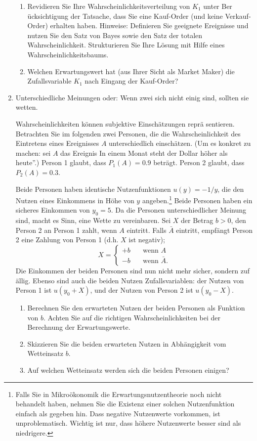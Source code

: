 \begin{enumerate}
\begin{enumerate}
\item Revidieren Sie Ihre Wahrscheinlichkeitsverteilung von $K_{1}$ unter Ber%
\"{u}cksichtigung der Tatsache, dass Sie eine Kauf-Order (und keine
Verkauf-Order) erhalten haben. Hinweise: Definieren Sie geeignete Ereignisse
und nutzen Sie den Satz von Bayes sowie den Satz der totalen
Wahrscheinlichkeit. Strukturieren Sie Ihre L\"{o}sung mit Hilfe eines
Wahrscheinlichkeitsbaums.
\item Welchen Erwartungswert hat (aus Ihrer Sicht als Market Maker) die
Zufallsvariable $K_{1}$ nach Eingang der Kauf-Order?
\end{enumerate}

\item Unterschiedliche Meinungen oder: Wenn zwei sich nicht einig sind,
sollten sie wetten.

Wahrscheinlichkeiten k\"{o}nnen subjektive Einsch\"{a}tzungen repr\"{a}%
sentieren. Betrachten Sie im folgenden zwei Personen, die die
Wahrscheinlichkeit des Eintretens eines Ereignisses $A$ unterschiedlich
einsch\"{a}tzen. (Um es konkret zu machen: sei $A$ das Ereignis
\quotedblbase In einem Monat steht der Dollar h\"{o}her als
heute\textquotedblright .) Person 1 glaubt, dass $P_{1}(A)=0.9$ betr\"{a}gt.
Person 2 glaubt, dass $P_{2}(A)=0.3$.

Beide Personen haben identische Nutzenfunktionen $u(y)=-1/y$, die den Nutzen
eines Einkommens in H\"{o}he von $y$ angeben.\footnote{%
Falls Sie in Mikro\"{o}konomik die Erwartungsnutzentheorie noch nicht
behandelt haben, nehmen Sie die Existenz einer solchen Nutzenfunktion
einfach als gegeben hin. Dass negative Nutzenwerte vorkommen, ist
unproblematisch. Wichtig ist nur, dass h\"{o}here Nutzenwerte besser sind
als niedrigere.} Beide Personen haben ein sicheres Einkommen von $y_{0}=5$.
Da die Personen unterschiedlicher Meinung sind, macht es Sinn, eine Wette zu
vereinbaren. Sei $X$ der Betrag $b>0$, den Person 2 an Person 1 zahlt, wenn $%
A$ eintritt. Falls $\bar{A}$ eintritt, empf\"{a}ngt Person 2 eine Zahlung
von Person 1 (d.h. $X$ ist negativ);%
\begin{equation*}
X=\left\{ 
\begin{array}{ll}
+b & \quad \text{wenn }A \\ 
-b & \quad \text{wenn }\bar{A}.%
\end{array}%
\right.
\end{equation*}%
Die Einkommen der beiden Personen sind nun nicht mehr sicher, sondern zuf%
\"{a}llig. Ebenso sind auch die beiden Nutzen Zufallsvariablen: der Nutzen
von Person 1 ist $u(y_{0}+X)$, und der Nutzen von Person 2 ist $u(y_{0}-X)$.
\begin{enumerate}
\item Berechnen Sie den erwarteten Nutzen der beiden Personen als Funktion
von $b$. Achten Sie auf die richtigen Wahrscheinlichkeiten bei der
Berechnung der Erwartungswerte.
\item Skizzieren Sie die beiden erwarteten Nutzen in Abh\"{a}ngigkeit vom
Wetteinsatz $b$.
\item Auf welchen Wetteinsatz werden sich die beiden Personen einigen?
\end{enumerate}


\end{enumerate}
